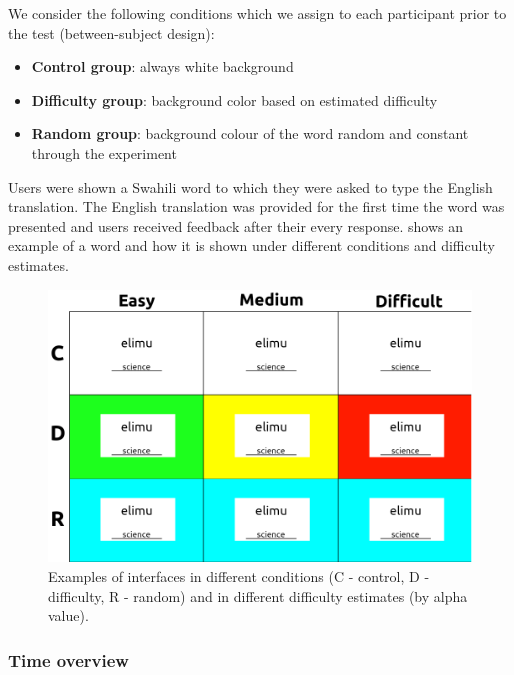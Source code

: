 We consider the following conditions which we assign to each participant prior to the test (between-subject design):

\begin{itemize}[noitemsep]
\item \textbf{Control group}: always white background
\item \textbf{Difficulty group}: background color based on estimated difficulty
\item \textbf{Random group}: background colour of the word random and constant through the experiment
\end{itemize}

Users were shown a Swahili word to which they were asked to type the English translation.
The English translation was provided for the first time the word was presented and users received feedback after their every response.
 shows an example of a word and how it is shown under different conditions and difficulty estimates.

\begin{figure}[ht]
\includegraphics[width=\linewidth]{img/interface.pdf}
\caption{Examples of interfaces in different conditions (C - control, D - difficulty, R - random) and in different difficulty estimates (by alpha value).}
\label{fig:interface}
\end{figure}

\subsubsection{Time overview}

